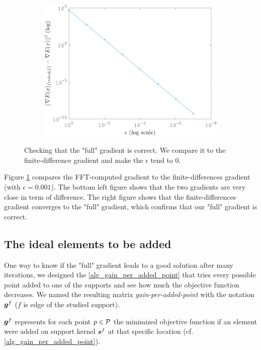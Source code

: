 \begin{figure}[!ht]
\begin{subfigure}[b]{0.299\textwidth}\centering
\includegraphics[width=1\textwidth]{figures/verif_gradient/finite-diff-vs-grad.png}
\end{subfigure}
\caption{Checking that the "full" gradient is correct. We compare it to the finite-difference gradient and make the $\epsilon$ tend to 0.} \label{fig_verif_gradient}
\end{figure}

Figure \ref{fig_verif_gradient} compares the FFT-computed gradient to the finite-differences gradient (with $\epsilon=0.001$). The bottom left figure shows that the two gradients are very close in term of difference. The right figure shows that the finite-differences gradient converges to the "full" gradient, which confirms that our "full" gradient is correct.

\subsection{The ideal elements to be added}\label{sec_gain_per_added_point}

One way to know if the "full" gradient leads to a good solution after many iterations, we designed the \cref{alg_gain_per_added_point} that tries every possible point added to one of the supports and see how much the objective function decreases. We named the resulting matrix \emph{gain-per-added-point} with the notation $\g^f$ ($f$ is edge of the studied support).

$\g^f$ represents for each point $p \in \P$ the minimized objective function if an element were added on support kernel $\s^f$ at that specific location (cf. \cref{alg_gain_per_added_point}).

